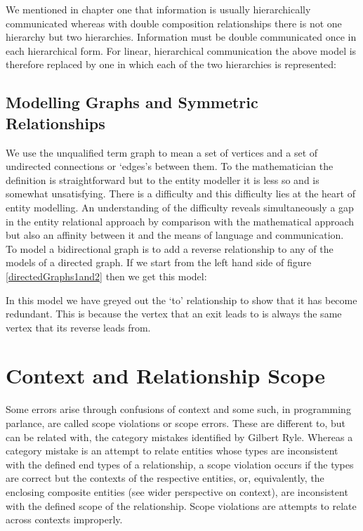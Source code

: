 \noindent We mentioned in chapter one that information is usually hierarchically communicated whereas with double composition relationships there is not one hierarchy but two hierarchies. Information must 
be double communicated once in each hierarchical form. For linear, hierarchical communication the above model is therefore replaced by one in which each of the two hierarchies is represented:
 


\subsection{Modelling Graphs and Symmetric Relationships}
We use the unqualified term graph to mean a set of vertices and a set of undirected connections or `edges's between them. To the mathematician the definition is straightforward but to the entity modeller it is less so and is somewhat unsatisfying. 
There is a difficulty and this difficulty lies at the heart of entity modelling. An understanding of the difficulty reveals simultaneously a gap in the entity relational approach by comparison with the mathematical approach but also an affinity between it and the means of language and communication.\\

\noindent To model a bidirectional graph is to add a reverse relationship to any of the models of a directed graph. If we start from the left hand side of figure \ref{directedGraphs1and2} then we get this model:

\noindent In this model we have greyed out the `to' relationship to show that it has become redundant. This is because the vertex that an exit leads to is always the same vertex that its reverse leads from. 

\section {Context and Relationship Scope}
Some errors arise through confusions of context and some such, in programming parlance, are called scope violations or scope errors. 
These are different to, but can be related with, the category mistakes identified by 
Gilbert Ryle. Whereas a category mistake is an attempt to relate entities whose types are inconsistent with the defined end types of a relationship, 
a scope violation occurs if the types are correct but the contexts of the respective entities, or, equivalently, the enclosing composite entities 
(see wider perspective on context), are inconsistent with the defined scope of the relationship.
Scope violations are attempts to relate across contexts improperly.\\

